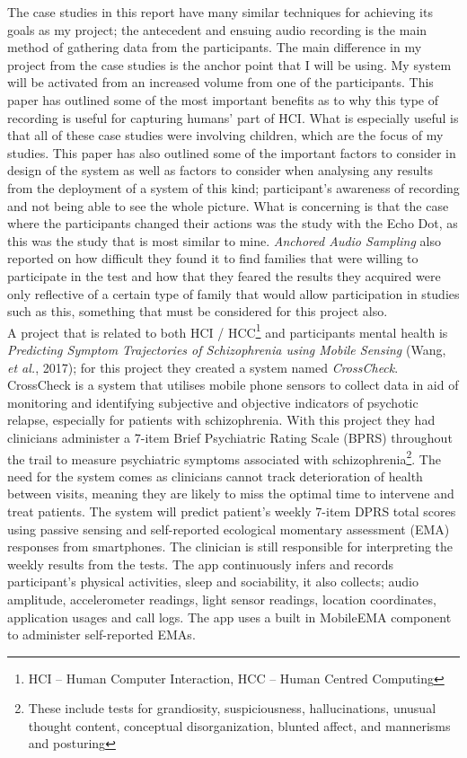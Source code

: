 \documentclass[a4paper,11pt]{report}
\begin{document}
The case studies in this report have many similar techniques for achieving its goals as my project; the antecedent and ensuing audio recording is the main method of gathering data from the participants. The main difference in my project from the case studies is the anchor point that I will be using. My system will be activated from an increased volume from one of the participants. This paper has outlined some of the most important benefits as to why this type of recording is useful for capturing humans’ part of HCI. What is especially useful is that all of these case studies were involving children, which are the focus of my studies. This paper has also outlined some of the important factors to consider in design of the system as well as factors to consider when analysing any results from the deployment of a system of this kind; participant’s awareness of recording and not being able to see the whole picture. What is concerning is that the case where the participants changed their actions was the study with the Echo Dot, as this was the study that is most similar to mine. \textit{Anchored Audio Sampling} also reported on how difficult they found it to find families that were willing to participate in the test and how that they feared the results they acquired were only reflective of a certain type of family that would allow participation in studies such as this, something that must be considered for this project also.\\

A project that is related to both HCI / HCC\footnote{HCI – Human Computer Interaction, HCC – Human Centred Computing}   and participants mental health is \textit{Predicting Symptom Trajectories of Schizophrenia using Mobile Sensing} (Wang, \textit{et al.}, 2017); for this project they created a system named \textit{CrossCheck}. CrossCheck is a system that utilises mobile phone sensors to collect data in aid of monitoring and identifying subjective and objective indicators of psychotic relapse, especially for patients with schizophrenia. With this project they had clinicians administer a 7-item Brief Psychiatric Rating Scale (BPRS) throughout the trail to measure psychiatric symptoms associated with schizophrenia\footnote{These include tests for grandiosity, suspiciousness, hallucinations, unusual thought content, conceptual disorganization, blunted affect, and mannerisms and posturing}. The need for the system comes as clinicians cannot track deterioration of health between visits, meaning they are likely to miss the optimal time to intervene and treat patients. The system will predict patient’s weekly 7-item DPRS total scores using passive sensing and self-reported ecological momentary assessment (EMA) responses from smartphones. The clinician is still responsible for interpreting the weekly results from the tests. The app continuously infers and records participant’s physical activities, sleep and sociability, it also collects; audio amplitude, accelerometer readings, light sensor readings, location coordinates, application usages and call logs. The app uses a built in MobileEMA component to administer self-reported EMAs.\\
\end{document}
